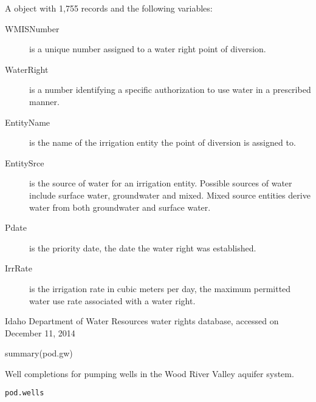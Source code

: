 \documentclass[a4paper]{book}
\begin{document}
\begin{Format}
A  object with 1,755 records and the following variables:
\begin{description}

\item[WMISNumber] is a unique number assigned to a water right point of diversion.
\item[WaterRight] is a number identifying a specific authorization to use water in a prescribed manner.
\item[EntityName] is the name of the irrigation entity the point of diversion is assigned to.
\item[EntitySrce] is the source of water for an irrigation entity.
Possible sources of water include surface water, groundwater and mixed.
Mixed source entities derive water from both groundwater and surface water.
\item[Pdate] is the priority date, the date the water right was established.
\item[IrrRate] is the irrigation rate in cubic meters per day, the maximum permitted water use rate associated with a water right.

\end{description}

\end{Format}
%
\begin{Source}\relax
Idaho Department of Water Resources water rights database, accessed on December 11, 2014
\end{Source}
%
\begin{SeeAlso}\relax
{}
\end{SeeAlso}
%
\begin{Examples}
\begin{ExampleCode}
summary(pod.gw)
\end{ExampleCode}
\end{Examples}
%
\begin{Description}\relax
Well completions for pumping wells in the Wood River Valley aquifer system.
\end{Description}
%
\begin{Usage}
\begin{verbatim}
pod.wells
\end{verbatim}
\end{Usage}
%
\end{document}
